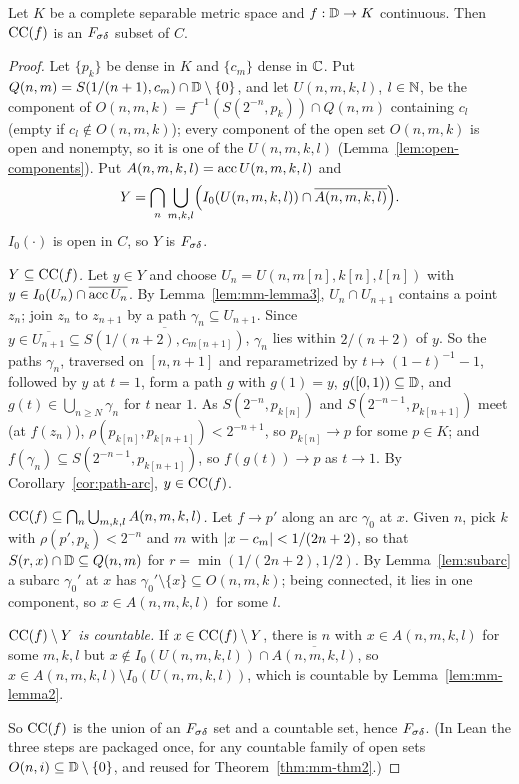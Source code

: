 \begin{theorem}\label{thm:mcmillan}
Let $K$ be a complete separable metric space and $f:\mathbb{D}\to K$ continuous. Then $\operatorname{CC}(f)$ is an $F_{\sigma\delta}$
subset of $C$.
\end{theorem}
\begin{proof}
Let $\{p_k\}$ be dense in $K$ and $\{c_m\}$ dense in $\mathbb{C}$. Put
$Q(n,m)=S(1/(n+1),c_m)\cap\mathbb{D}\setminus\{0\}$, and let $U(n,m,k,l)$, $l\in\mathbb{N}$, be the component of
$O(n,m,k)=f^{-1}(S(2^{-n},p_k))\cap Q(n,m)$ containing $c_l$ (empty if $c_l\notin O(n,m,k)$); every component of the
open set $O(n,m,k)$ is open and nonempty, so it is one of the $U(n,m,k,l)$ (Lemma~\ref{lem:open-components}). Put
$A(n,m,k,l)=\operatorname{acc} U(n,m,k,l)$ and
\[
Y=\bigcap_n\bigcup_{m,k,l}\Bigl(I_0(U(n,m,k,l))\cap\overline{A(n,m,k,l)}\Bigr).
\]
$I_0(\cdot)$ is open in $C$, so $Y$ is $F_{\sigma\delta}$.

\emph{$Y\subseteq\operatorname{CC}(f)$.} Let $y\in Y$ and choose $U_n=U(n,m[n],k[n],l[n])$ with
$y\in I_0(U_n)\cap\overline{\operatorname{acc} U_n}$. By Lemma~\ref{lem:mm-lemma3}, $U_n\cap U_{n+1}$ contains a
point $z_n$; join $z_n$ to $z_{n+1}$ by a path $\gamma_n\subseteq U_{n+1}$. Since
$y\in\overline{U_{n+1}}\subseteq\overline{S(1/(n+2),c_{m[n+1]})}$, $\gamma_n$ lies within $2/(n+2)$ of $y$. So
the paths $\gamma_n$, traversed on $[n,n+1]$ and reparametrized by $t\mapsto(1-t)^{-1}-1$, followed by $y$ at $t=1$,
form a path $g$ with $g(1)=y$, $g([0,1))\subseteq\mathbb{D}$, and $g(t)\in\bigcup_{n\ge N}\gamma_n$ for $t$ near $1$. As
$S(2^{-n},p_{k[n]})$ and $S(2^{-n-1},p_{k[n+1]})$ meet (at $f(z_n)$), $\rho(p_{k[n]},p_{k[n+1]})<2^{-n+1}$, so
$p_{k[n]}\to p$ for some $p\in K$; and $f(\gamma_n)\subseteq S(2^{-n-1},p_{k[n+1]})$, so $f(g(t))\to p$ as $t\to1$.
By Corollary~\ref{cor:path-arc}, $y\in\operatorname{CC}(f)$.

\emph{$\operatorname{CC}(f)\subseteq\bigcap_n\bigcup_{m,k,l}A(n,m,k,l)$.} Let $f\to p'$ along an arc $\gamma_0$ at $x$.
Given $n$, pick $k$ with $\rho(p',p_k)<2^{-n}$ and $m$ with $\lvert x-c_m\rvert<1/(2n+2)$, so that
$S(r,x)\cap\mathbb{D}\subseteq Q(n,m)$ for $r=\min(1/(2n+2),1/2)$. By Lemma~\ref{lem:subarc} a subarc $\gamma_0'$ at $x$ has
$\gamma_0'\setminus\{x\}\subseteq O(n,m,k)$; being connected, it lies in one component, so $x\in A(n,m,k,l)$
for some $l$.

\emph{$\operatorname{CC}(f)\setminus Y$ is countable.} If $x\in\operatorname{CC}(f)\setminus Y$, there is $n$ with
$x\in A(n,m,k,l)$ for some $m,k,l$ but $x\notin I_0(U(n,m,k,l))\cap\overline{A(n,m,k,l)}$, so
$x\in A(n,m,k,l)\setminus I_0(U(n,m,k,l))$, which is countable by Lemma~\ref{lem:mm-lemma2}.

So $\operatorname{CC}(f)$ is the union of an $F_{\sigma\delta}$ set and a countable set, hence $F_{\sigma\delta}$. (In Lean the three steps are
packaged once, for any countable family of open sets $O(n,i)\subseteq\mathbb{D}\setminus\{0\}$, and reused for
Theorem~\ref{thm:mm-thm2}.)
\end{proof}

